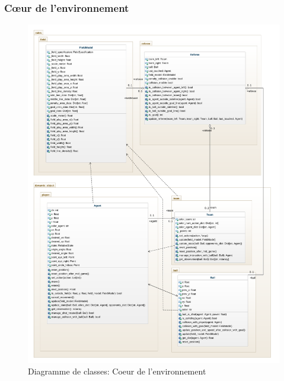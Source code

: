 \documentclass[11pt, a4paper]{article}
\begin{document}
	\subsubsection{Cœur de l'environnement}
	\newpage
	\begin{figure}[H]
		\centering
		\includegraphics[scale=0.5]{images/robocup-core.png}
		\caption {Diagramme de classes: Coeur de l'environnement  }
	\end{figure}
\end{document}
